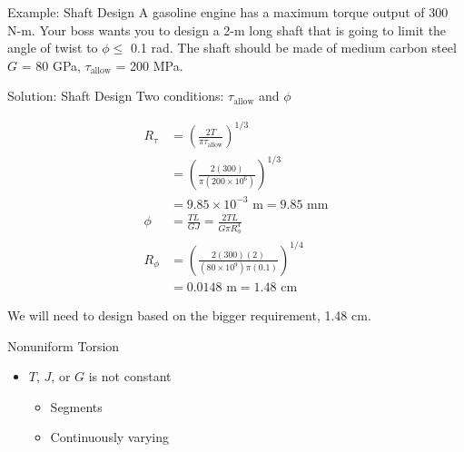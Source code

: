 \documentclass[10pt, svgnames]{beamer}
\begin{document}
\begin{frame}[label={sec:orgc89ed29}]{Example: Shaft Design}
A gasoline engine has a maximum torque output of 300 N-m. Your boss wants you to design a 2-m long shaft that is going to limit the angle of twist to \(\phi \leqslant\) 0.1 rad. The shaft should be made of medium carbon steel \(G\) = 80 GPa, \(\tau_{\text{allow}}\) = 200 MPa.
\end{frame}

\begin{frame}[label={sec:org1d70412}]{Solution: Shaft Design}
Two conditions: \(\tau_{\text{allow}}\) and \(\phi\)

\begin{align*}
  R_{\tau} &= \left( \frac{2T}{\pi \tau_{\text{allow}}} \right)^{1/3} \\
           &= \left( \frac{2(300)}{\pi (200 \times 10^6)} \right)^{1/3} \\
           &= 9.85 \times 10^{-3} \text{ m} = 9.85 \text{ mm} \\
  \phi &= \frac{TL}{GJ} = \frac{2TL}{G \pi R_{\phi}^{4}} \\
  R_{\phi} &= \left( \frac{2(300)(2)}{(80 \times 10^{9})\pi(0.1)} \right)^{1/4} \\
           &= 0.0148 \text{ m} = 1.48 \text{ cm}
\end{align*}

We will need to design based on the bigger requirement, 1.48 cm.
\end{frame}

\begin{frame}[label={sec:orgccc53d6}]{Nonuniform Torsion}
\begin{itemize}
\item \(T\), \(J\), or \(G\) is not constant

\begin{itemize}
\item Segments

\item Continuously varying
\end{itemize}
\end{itemize}
\end{frame}
\end{document}
